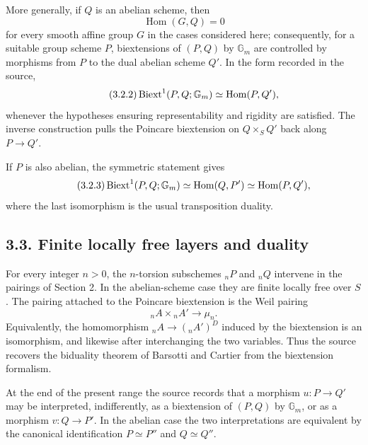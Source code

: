 \documentclass[11pt]{article}
\providecommand{\Gm}{\mathbb G_m}
\providecommand{\Hom}{\operatorname{Hom}}
\begin{document}
More generally, if \(Q\) is an abelian scheme, then
\begin{equation}\tag{3.2.1}
        \Hom(G,Q)=0
\end{equation}
for every smooth affine group \(G\) in the cases considered here; consequently, for a suitable group scheme \(P\), biextensions of \((P,Q)\) by \(\Gm\) are controlled by morphisms from \(P\) to the dual abelian scheme \(Q'\).  In the form recorded in the source,
\begin{equation}\tag{3.2.2}
        \Biext^1(P,Q;\Gm)\simeq \Hom(P,Q'),
\end{equation}
whenever the hypotheses ensuring representability and rigidity are satisfied.  The inverse construction pulls the Poincare biextension on \(Q\times_SQ'\) back along \(P\to Q'\).

If \(P\) is also abelian, the symmetric statement gives
\begin{equation}\tag{3.2.3}
        \Biext^1(P,Q;\Gm)\simeq \Hom(Q,P')
        \simeq \Hom(P,Q'),
\end{equation}
where the last isomorphism is the usual transposition duality.

\subsection*{3.3. Finite locally free layers and duality}

For every integer \(n>0\), the \(n\)-torsion subschemes \({}_nP\) and \({}_nQ\) intervene in the pairings of Section 2.  In the abelian-scheme case they are finite locally free over \(S\).  The pairing attached to the Poincare biextension is the Weil pairing
\begin{equation}\tag{3.3.1}
        {}_nA\times {}_nA'\longrightarrow \mu_n.
\end{equation}
Equivalently, the homomorphism \({}_nA\to({}_nA')^D\) induced by the biextension is an isomorphism, and likewise after interchanging the two variables.  Thus the source recovers the biduality theorem of Barsotti and Cartier from the biextension formalism.

At the end of the present range the source records that a morphism \(u:P\to Q'\) may be interpreted, indifferently, as a biextension of \((P,Q)\) by \(\Gm\), or as a morphism \(v:Q\to P'\).  In the abelian case the two interpretations are equivalent by the canonical identification \(P\simeq P''\) and \(Q\simeq Q''\).
\end{document}

